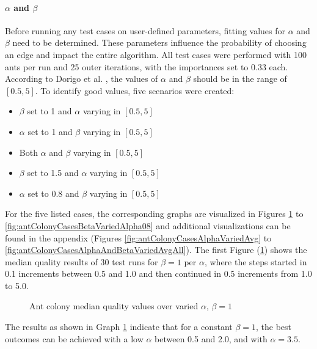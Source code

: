 \paragraph{\boldmath${\alpha}$ and \boldmath${\beta}$}

Before running any test cases on user-defined parameters, fitting values for $\alpha$ and $\beta$ need to be determined.
These parameters influence the probability of choosing an edge and impact the entire algorithm.
All test cases were performed with 100 ants per run and 25 outer iterations, with the importances set to 0.33 each. 
According to Dorigo et al. \cite{dorigo_ant_1996}, the values of $\alpha$ and $\beta$ should be in the range of $[0.5,5]$.
To identify good values, five scenarios were created:
\begin{itemize}
	\item $\beta$ set to 1 and $\alpha$ varying in $[0.5, 5]$
	\item $\alpha$ set to 1 and $\beta$ varying in $[0.5, 5]$
	\item Both $\alpha$ and $\beta$ varying in $[0.5, 5]$
	\item $\beta$ set to 1.5 and $\alpha$ varying in $[0.5, 5]$
	\item $\alpha$ set to 0.8 and $\beta$ varying in $[0.5, 5]$
\end{itemize}


For the five listed cases, the corresponding graphs are visualized in Figures \ref{fig:antColonyCasesAlphaVariedMed} to \ref{fig:antColonyCasesBetaVariedAlpha08} and additional visualizations can be found in the appendix (Figures \ref{fig:antColonyCasesAlphaVariedAvg} to \ref{fig:antColonyCasesAlphaAndBetaVariedAvgAll}).
The first Figure (\ref{fig:antColonyCasesAlphaVariedMed}) shows the median quality results of 30 test runs for $\beta = 1$ per $\alpha$, where the steps started in 0.1 increments between 0.5 and 1.0 and then continued in 0.5 increments from 1.0 to 5.0.


\begin{figure}
	\centering
	
	\caption{Ant colony median quality values over varied $\alpha$, $\beta = 1$}
	\label{fig:antColonyCasesAlphaVariedMed}
\end{figure}


The results as shown in Graph \ref{fig:antColonyCasesAlphaVariedMed} indicate that for a constant $\beta = 1$, the best outcomes can be achieved with a low $\alpha$ between 0.5 and 2.0, and with $\alpha = 3.5$.

